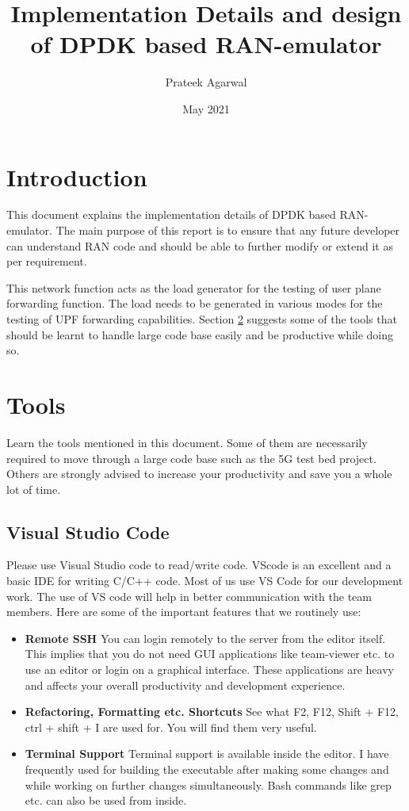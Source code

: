 \documentclass{article}
\title{Implementation Details and design of DPDK based RAN-emulator}
\author{Prateek Agarwal}
\date{May 2021}
\begin{document}
\maketitle
\tableofcontents

 \section{Introduction} \label{Intro} 
 This document explains the implementation details of DPDK based RAN-emulator. The main purpose of this report is to ensure that any future developer can understand RAN code and should be able to further modify or extend it as per requirement.

 This network function acts as the load generator for the testing of user plane forwarding function.
 The load needs to be generated in various modes for the testing of UPF forwarding capabilities.
 Section \ref{tools} suggests some of the tools that should be learnt to handle large code base easily and be productive while doing so.

\section{Tools} \label{tools}
Learn the tools mentioned in this document.
Some of them are necessarily required to move through a large code base such as the 5G test bed project. Others are strongly advised to increase your productivity and save you a whole lot of time.
\subsection{Visual Studio Code}
Please use Visual Studio code to read/write code. VScode is an excellent and a  basic IDE for writing C/C++ code. Most of us use VS Code for our development work. The use of VS code will help in better communication with the team members. Here are some of the important features that we routinely use:
\begin{itemize}
    \item \textbf{Remote SSH} You can login remotely to the server from the editor itself. This implies that you do not need GUI applications like team-viewer etc. to use an editor or login on a graphical interface. These applications are heavy and affects your overall productivity and development experience.
    \item \textbf{Refactoring, Formatting etc. Shortcuts} See what F2, F12, Shift + F12, ctrl + shift + I are used for. You will find them very useful.
    \item \textbf{Terminal Support} Terminal support is available inside the editor. I have frequently used for building the executable after making some changes and while working on further changes simultaneously. Bash commands like grep etc. can also be used from inside.
    \end{itemize}
\end{document}
